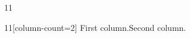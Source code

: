 \documentclass[paper=A4]{ropas-poster}
\begin{document}
\begin{postergrid}{1}{1}
\begin{posterblock}{1}{1}[column-count=2]
First column.\columnbreak Second column.
\end{posterblock}
\end{postergrid}
\end{document}

